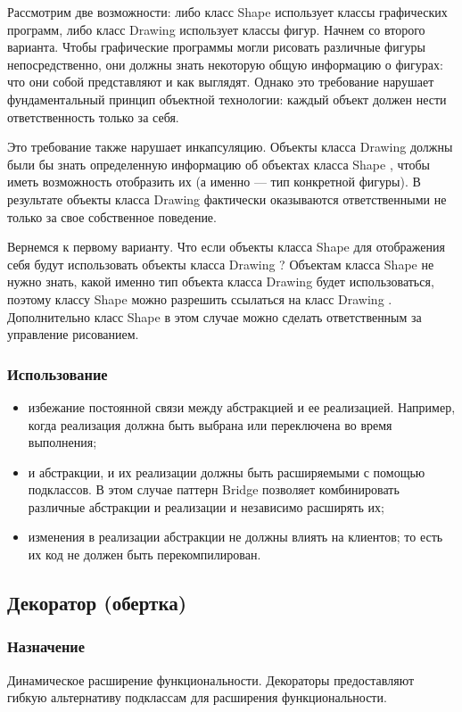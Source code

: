 \documentclass[10pt]{article}
\begin{document}
Рассмотрим две возможности: либо класс Shape использует классы графических
программ, либо класс Drawing использует классы фигур.
Начнем со второго варианта. Чтобы графические программы могли рисовать
различные фигуры непосредственно, они должны знать некоторую общую информацию
о фигурах: что они собой представляют и как выглядят. Однако это требование
нарушает фундаментальный принцип объектной технологии: каждый объект должен
нести ответственность только за себя.

Это требование также нарушает инкапсуляцию. Объекты класса Drawing должны
были бы знать определенную информацию об объектах класса Shape , чтобы иметь
возможность отобразить их (а именно — тип конкретной фигуры). В результате
объекты класса Drawing фактически оказываются ответственными не только за свое
собственное поведение.

Вернемся к первому варианту. Что если объекты класса Shape для отображения
себя будут использовать объекты класса Drawing ? Объектам класса Shape не нужно
знать, какой именно тип объекта класса Drawing будет использоваться, поэтому
классу Shape можно разрешить ссылаться на класс Drawing . Дополнительно класс Shape
в этом случае можно сделать ответственным за управление рисованием.
\subsubsection{Использование}
\begin{itemize}
	\item избежание постоянной связи между абстракцией и ее реализацией. Например, когда реализация должна быть выбрана или переключена во время выполнения;
	\item и абстракции, и их реализации должны быть расширяемыми с помощью подклассов. В этом случае паттерн Bridge позволяет комбинировать различные абстракции и реализации и независимо расширять их;
	\item изменения в реализации абстракции не должны влиять на клиентов; то есть их код не должен быть перекомпилирован.
\end{itemize}


\subsection{Декоратор (обертка)}
\subsubsection{Назначение}
Динамическое расширение функциональности. Декораторы предоставляют гибкую альтернативу подклассам для расширения функциональности.
\end{document}
